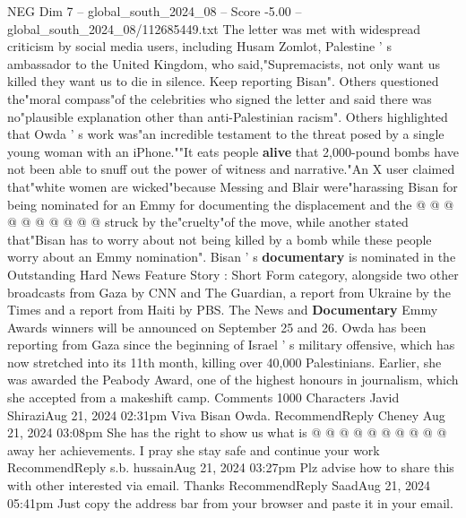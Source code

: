 \begin{textsample}{NEG Dim 7 – global\_south\_2024\_08 – Score -5.00 – global\_south\_2024\_08/112685449.txt}
The letter was met with widespread criticism by social media users, including Husam Zomlot, Palestine ' s ambassador to the United Kingdom, who said,"Supremacists, not only want us killed they want us to die in silence.
Keep reporting Bisan".
Others questioned the"moral compass"of the celebrities who signed the letter and said there was no"plausible explanation other than anti-Palestinian racism".
Others highlighted that Owda ' s work was"an incredible testament to the threat posed by a single young woman with an iPhone.""It eats people \textbf{alive} that 2,000-pound bombs have not been able to snuff out the power of witness and narrative."An X user claimed that"white women are wicked"because Messing and Blair were"harassing Bisan for being nominated for an Emmy for documenting the displacement and the @ @ @ @ @ @ @ @ @ @ struck by the"cruelty"of the move, while another stated that"Bisan has to worry about not being killed by a bomb while these people worry about an Emmy nomination".
Bisan ' s \textbf{documentary} is nominated in the Outstanding Hard News Feature Story : Short Form category, alongside two other broadcasts from Gaza by CNN and The Guardian, a report from Ukraine by the Times and a report from Haiti by PBS.
The News and \textbf{Documentary} Emmy Awards winners will be announced on September 25 and 26.
Owda has been reporting from Gaza since the beginning of Israel ' s military offensive, which has now stretched into its 11th month, killing over 40,000 Palestinians.
Earlier, she was awarded the Peabody Award, one of the highest honours in journalism, which she accepted from a makeshift camp.
Comments 1000 Characters Javid ShiraziAug 21, 2024 02:31pm Viva Bisan Owda.
RecommendReply Cheney Aug 21, 2024 03:08pm She has the right to show us what is @ @ @ @ @ @ @ @ @ @ away her achievements.
I pray she stay safe and continue your work RecommendReply s.b. hussainAug 21, 2024 03:27pm Plz advise how to share this with other interested via email.
Thanks RecommendReply SaadAug 21, 2024 05:41pm Just copy the address bar from your browser and paste it in your email.

\end{textsample}

